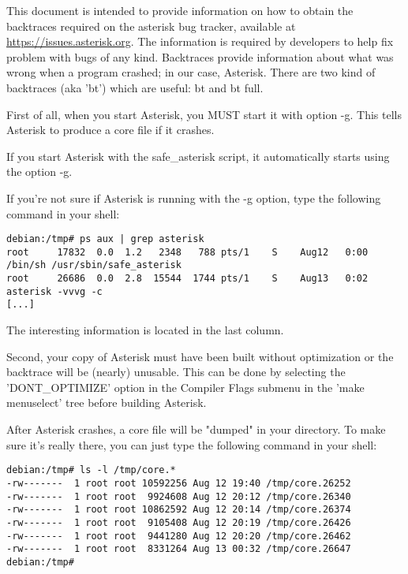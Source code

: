 This document is intended to provide information on how to obtain the
backtraces required on the asterisk bug tracker, available at
\url{https://issues.asterisk.org}. The information is required by developers to
help fix problem with bugs of any kind. Backtraces provide information
about what was wrong when a program crashed; in our case,
Asterisk. There are two kind of backtraces (aka 'bt') which are
useful: bt and bt full.

First of all, when you start Asterisk, you MUST start it with option
-g. This tells Asterisk to produce a core file if it crashes.

If you start Asterisk with the safe\_asterisk script, it automatically
starts using the option -g.

If you're not sure if Asterisk is running with the -g option, type the
following command in your shell:

\begin{astlisting}
\begin{verbatim}
debian:/tmp# ps aux | grep asterisk
root     17832  0.0  1.2   2348   788 pts/1    S    Aug12   0:00 /bin/sh /usr/sbin/safe_asterisk
root     26686  0.0  2.8  15544  1744 pts/1    S    Aug13   0:02 asterisk -vvvg -c
[...]
\end{verbatim}
\end{astlisting}

The interesting information is located in the last column.

Second, your copy of Asterisk must have been built without
optimization or the backtrace will be (nearly) unusable. This can be
done by selecting the 'DONT\_OPTIMIZE' option in the Compiler Flags
submenu in the 'make menuselect' tree before building Asterisk.

After Asterisk crashes, a core file will be "dumped" in your 
directory. To make sure it's really there, you can just type the
following command in your shell:

\begin{astlisting}
\begin{verbatim}
debian:/tmp# ls -l /tmp/core.*
-rw-------  1 root root 10592256 Aug 12 19:40 /tmp/core.26252
-rw-------  1 root root  9924608 Aug 12 20:12 /tmp/core.26340
-rw-------  1 root root 10862592 Aug 12 20:14 /tmp/core.26374
-rw-------  1 root root  9105408 Aug 12 20:19 /tmp/core.26426
-rw-------  1 root root  9441280 Aug 12 20:20 /tmp/core.26462
-rw-------  1 root root  8331264 Aug 13 00:32 /tmp/core.26647
debian:/tmp#
\end{verbatim}
\end{astlisting}

